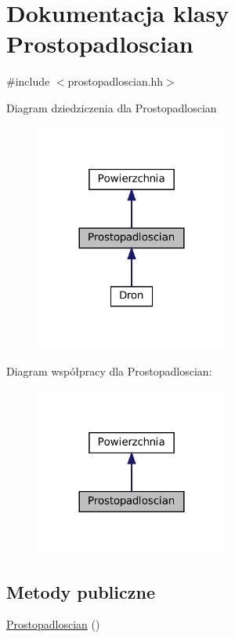 \hypertarget{class_prostopadloscian}{}\section{Dokumentacja klasy Prostopadloscian}
\label{class_prostopadloscian}


{\ttfamily \#include $<$prostopadloscian.\+hh$>$}



Diagram dziedziczenia dla Prostopadloscian\nopagebreak
\begin{figure}[H]
\begin{center}
\leavevmode
\includegraphics[width=180pt]{class_prostopadloscian__inherit__graph}
\end{center}
\end{figure}


Diagram współpracy dla Prostopadloscian\+:\nopagebreak
\begin{figure}[H]
\begin{center}
\leavevmode
\includegraphics[width=180pt]{class_prostopadloscian__coll__graph}
\end{center}
\end{figure}
\subsection*{Metody publiczne}
\begin{DoxyCompactItemize}
\item 
\mbox{\hyperlink{class_prostopadloscian_a432b8df2af37ba1a3596f500824eaffe}{Prostopadloscian}} ()
\end{DoxyCompactItemize}
